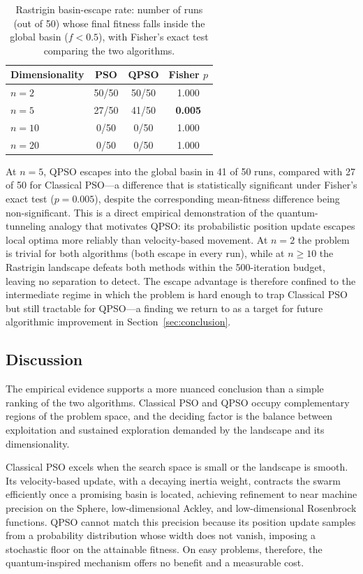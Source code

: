 \begin{table}[htbp]
\centering
\caption{Rastrigin basin-escape rate: number of runs (out of 50) whose final fitness falls inside the global basin ($f < 0.5$), with Fisher's exact test comparing the two algorithms.}
\label{tab:escape}
\small
\begin{tabular}{@{}lccc@{}}
\toprule
\textbf{Dimensionality} & \textbf{PSO} & \textbf{QPSO} & \textbf{Fisher $p$} \\
\midrule
$n = 2$  & 50/50 & 50/50 & 1.000 \\
$n = 5$  & 27/50 & 41/50 & \textbf{0.005} \\
$n = 10$ & 0/50  & 0/50  & 1.000 \\
$n = 20$ & 0/50  & 0/50  & 1.000 \\
\bottomrule
\end{tabular}
\end{table}

At $n = 5$, QPSO escapes into the global basin in 41 of 50 runs, compared with 27 of 50 for Classical PSO---a difference that is statistically significant under Fisher's exact test ($p = 0.005$), despite the corresponding mean-fitness difference being non-significant. This is a direct empirical demonstration of the quantum-tunneling analogy that motivates QPSO: its probabilistic position update escapes local optima more reliably than velocity-based movement. At $n = 2$ the problem is trivial for both algorithms (both escape in every run), while at $n \geq 10$ the Rastrigin landscape defeats both methods within the 500-iteration budget, leaving no separation to detect. The escape advantage is therefore confined to the intermediate regime in which the problem is hard enough to trap Classical PSO but still tractable for QPSO---a finding we return to as a target for future algorithmic improvement in Section~\ref{sec:conclusion}.

\subsection{Discussion}
\label{subsec:discussion}

The empirical evidence supports a more nuanced conclusion than a simple ranking of the two algorithms. Classical PSO and QPSO occupy complementary regions of the problem space, and the deciding factor is the balance between exploitation and sustained exploration demanded by the landscape and its dimensionality.

Classical PSO excels when the search space is small or the landscape is smooth. Its velocity-based update, with a decaying inertia weight, contracts the swarm efficiently once a promising basin is located, achieving refinement to near machine precision on the Sphere, low-dimensional Ackley, and low-dimensional Rosenbrock functions. QPSO cannot match this precision because its position update samples from a probability distribution whose width does not vanish, imposing a stochastic floor on the attainable fitness. On easy problems, therefore, the quantum-inspired mechanism offers no benefit and a measurable cost.

